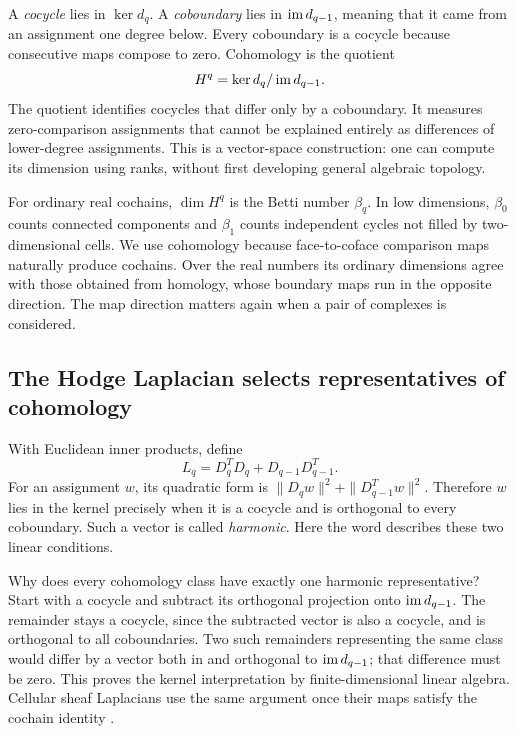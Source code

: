 A \emph{cocycle} lies in $\ker d_q$. A \emph{coboundary} lies in $\operatorname{im} d_{q-1}$, meaning that it came from an assignment one degree below. Every coboundary is a cocycle because consecutive maps compose to zero. Cohomology is the quotient
\begin{equation}
H^q=\ker d_q/\operatorname{im} d_{q-1}.
\label{eq:tutorial-cohomology}
\end{equation}
The quotient identifies cocycles that differ only by a coboundary. It measures zero-comparison assignments that cannot be explained entirely as differences of lower-degree assignments. This is a vector-space construction: one can compute its dimension using ranks, without first developing general algebraic topology.

For ordinary real cochains, $\dim H^q$ is the Betti number $\beta_q$. In low dimensions, $\beta_0$ counts connected components and $\beta_1$ counts independent cycles not filled by two-dimensional cells. We use cohomology because face-to-coface comparison maps naturally produce cochains. Over the real numbers its ordinary dimensions agree with those obtained from homology, whose boundary maps run in the opposite direction. The map direction matters again when a pair of complexes is considered.

\subsection{The Hodge Laplacian selects representatives of cohomology}
With Euclidean inner products, define
\begin{equation}
L_q=D_q^TD_q+D_{q-1}D_{q-1}^T.
\end{equation}
For an assignment $w$, its quadratic form is $\|D_qw\|^2+\|D_{q-1}^Tw\|^2$. Therefore $w$ lies in the kernel precisely when it is a cocycle and is orthogonal to every coboundary. Such a vector is called \emph{harmonic}. Here the word describes these two linear conditions.

Why does every cohomology class have exactly one harmonic representative? Start with a cocycle and subtract its orthogonal projection onto $\operatorname{im} d_{q-1}$. The remainder stays a cocycle, since the subtracted vector is also a cocycle, and is orthogonal to all coboundaries. Two such remainders representing the same class would differ by a vector both in and orthogonal to $\operatorname{im} d_{q-1}$; that difference must be zero. This proves the kernel interpretation by finite-dimensional linear algebra. Cellular sheaf Laplacians use the same argument once their maps satisfy the cochain identity \citep{hansen2019}.

